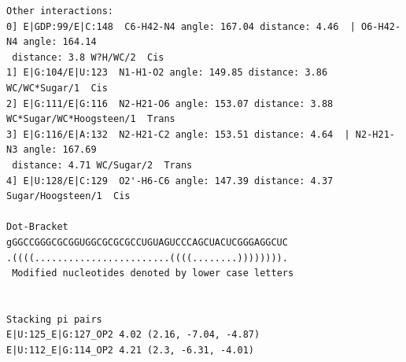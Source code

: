 \documentclass[12pt]{article}
\begin{document}
\begin{appendices}
\begin{scriptsize}
\begin{lstlisting}
Other interactions: 
0] E|GDP:99/E|C:148  C6-H42-N4 angle: 167.04 distance: 4.46  | O6-H42-N4 angle: 164.14
 distance: 3.8 W?H/WC/2  Cis
1] E|G:104/E|U:123  N1-H1-O2 angle: 149.85 distance: 3.86 WC/WC*Sugar/1  Cis
2] E|G:111/E|G:116  N2-H21-O6 angle: 153.07 distance: 3.88 WC*Sugar/WC*Hoogsteen/1  Trans
3] E|G:116/E|A:132  N2-H21-C2 angle: 153.51 distance: 4.64  | N2-H21-N3 angle: 167.69
 distance: 4.71 WC/Sugar/2  Trans
4] E|U:128/E|C:129  O2'-H6-C6 angle: 147.39 distance: 4.37 Sugar/Hoogsteen/1  Cis

Dot-Bracket
gGGCCGGGCGCGGUGGCGCGCGCCUGUAGUCCCAGCUACUCGGGAGGCUC
.((((........................((((........)))))))).
 Modified nucleotides denoted by lower case letters


Stacking pi pairs
E|U:125_E|G:127_OP2 4.02 (2.16, -7.04, -4.87)
E|U:112_E|G:114_OP2 4.21 (2.3, -6.31, -4.01)

\end{lstlisting}
\end{scriptsize}

\end{appendices}


\end{document}
